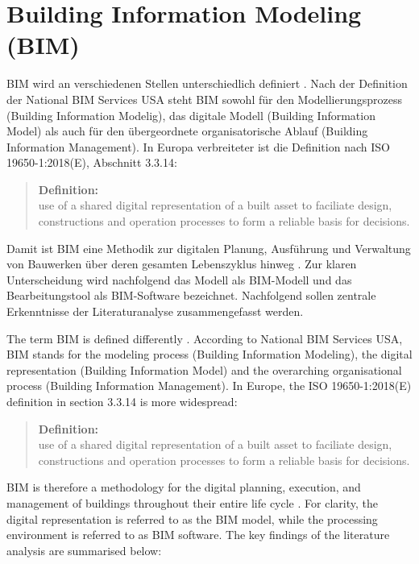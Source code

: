 \section{Building Information Modeling (BIM)}
\begin{German} 
    BIM wird an verschiedenen Stellen unterschiedlich definiert \cite{astourLehrbuchGrundlagenBIMArbeitsmethode2022}. Nach der Definition der National BIM Services USA steht BIM sowohl für den Modellierungsprozess (Building Information Modelig), das digitale Modell (Building Information Model) als auch für den übergeordnete organisatorische Ablauf (Building Information Management). In Europa verbreiteter ist die Definition nach ISO 19650-1:2018(E), Abschnitt 3.3.14:

    \begin{quote}
        \textbf{Definition:}\\
        use of a shared digital representation of a built asset to faciliate design, constructions and operation processes to form a reliable basis for decisions.
    \end{quote}
        
    Damit ist BIM eine Methodik zur digitalen Planung, Ausführung und Verwaltung von Bauwerken über deren gesamten Lebenszyklus hinweg \cite{astourLehrbuchGrundlagenBIMArbeitsmethode2022}. Zur klaren Unterscheidung wird nachfolgend das Modell als BIM-Modell und das Bearbeitungstool als BIM-Software bezeichnet. Nachfolgend sollen zentrale Erkenntnisse der Literaturanalyse zusammengefasst werden.
\end{German}

\begin{English}
    The term BIM is defined differently \cite{astourLehrbuchGrundlagenBIMArbeitsmethode2022}. According to National BIM Services USA, BIM stands for the modeling process (Building Information Modeling), the digital representation (Building Information Model) and the overarching organisational process (Building Information Management). In Europe, the ISO 19650-1:2018(E) definition in section 3.3.14 is more widespread:

    \begin{quote}
        \textbf{Definition:}\\
        use of a shared digital representation of a built asset to faciliate design, constructions and operation processes to form a reliable basis for decisions.
    \end{quote}

    BIM is therefore a methodology for the digital planning, execution, and management of buildings throughout their entire life cycle \cite{astourLehrbuchGrundlagenBIMArbeitsmethode2022}. For clarity, the digital representation is referred to as the BIM model, while the processing environment is referred to as BIM software. The key findings of the literature analysis are summarised below:
\end{English}

